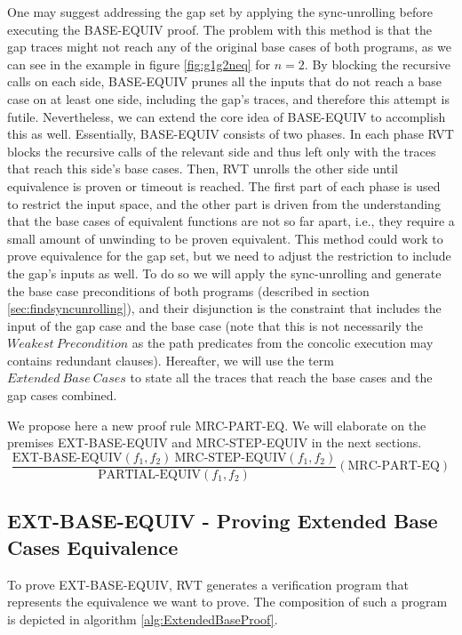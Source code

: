 One may suggest addressing the gap set by applying the sync-unrolling before executing the BASE-EQUIV proof. The problem with this method is that the gap traces might not reach any of the original base cases of both programs, as we can see in the example in figure \ref{fig:g1g2neq} for $n=2$. By blocking the recursive calls on each side, BASE-EQUIV prunes all the inputs that do not reach a base case on at least one side, including the gap's traces, and therefore this attempt is futile.
Nevertheless, we can extend the core idea of BASE-EQUIV to accomplish this as well. Essentially, BASE-EQUIV consists of two phases. In each phase RVT blocks the recursive calls of the relevant side and thus left only with the traces that reach this side's base cases. Then, RVT unrolls the other side until equivalence  is proven or timeout is reached. The first part of each phase is used to restrict the input space, and the other part is driven from the understanding that the base cases of equivalent functions are not so far apart, i.e., they require a small amount of unwinding to be proven equivalent. This method could work to prove equivalence for the gap set, but we need to adjust the restriction to include the gap's inputs as well. To do so we will apply the sync-unrolling and generate the base case preconditions of both programs (described in section \ref{sec:findsyncunrolling}), and their disjunction is the constraint that includes the input of the gap case and the base case (note that this is not necessarily the $Weakest\ Precondition$ \cite{10.1145/360933.360975} as the path predicates from the concolic execution may contains redundant clauses).
Hereafter, we will use the term $Extended\ Base\ Cases$ to state all the traces that reach the base cases and the gap cases combined. 

We propose here a new proof rule MRC-PART-EQ. We will elaborate on the premises EXT-BASE-EQUIV and MRC-STEP-EQUIV in the next sections.
\begin{equation}
 {\frac {\text{EXT-BASE-EQUIV}(f_1,f_2) \:\text{MRC-STEP-EQUIV}(f_1,f_2)}{\text{PARTIAL-EQUIV}(f_1,f_2)}} 
  (\text{MRC-PART-EQ})
\end{equation}

\subsection{EXT-BASE-EQUIV - Proving Extended Base Cases Equivalence}
\label{sec:EXT-BASE-EQUIV}
To prove EXT-BASE-EQUIV, RVT generates a verification program that represents the equivalence we want to prove. The composition of such a program is depicted in algorithm  \ref{alg:ExtendedBaseProof}.

